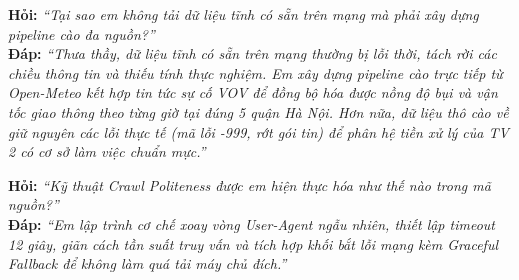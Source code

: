 \documentclass[11pt,a4paper]{article}
\begin{document}
\begin{tcolorbox}[colback=blue!5!white, colframe=blue!60!black, fonttitle=\bfseries\color{white}, title={BỘ CÂU HỎI VẤN ĐÁP TRỌNG TÂM DÀNH CHO TV 1}]
\textbf{Hỏi:} \textit{“Tại sao em không tải dữ liệu tĩnh có sẵn trên mạng mà phải xây dựng pipeline cào đa nguồn?”}\\
\textbf{Đáp:} \textit{“Thưa thầy, dữ liệu tĩnh có sẵn trên mạng thường bị lỗi thời, tách rời các chiều thông tin và thiếu tính thực nghiệm. Em xây dựng pipeline cào trực tiếp từ Open-Meteo kết hợp tin tức sự cố VOV để đồng bộ hóa được nồng độ bụi và vận tốc giao thông theo từng giờ tại đúng 5 quận Hà Nội. Hơn nữa, dữ liệu thô cào về giữ nguyên các lỗi thực tế (mã lỗi -999, rớt gói tin) để phân hệ tiền xử lý của TV 2 có cơ sở làm việc chuẩn mực.”}

\textbf{Hỏi:} \textit{“Kỹ thuật Crawl Politeness được em hiện thực hóa như thế nào trong mã nguồn?”}\\
\textbf{Đáp:} \textit{“Em lập trình cơ chế xoay vòng User-Agent ngẫu nhiên, thiết lập timeout 12 giây, giãn cách tần suất truy vấn và tích hợp khối bắt lỗi mạng kèm Graceful Fallback để không làm quá tải máy chủ đích.”}
\end{tcolorbox}

\end{document}
